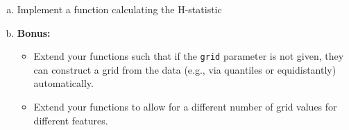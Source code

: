 {\begin{enumerate}[a)]
        \item
        Implement a function calculating the H-statistic

        \item \textbf{Bonus:}
        \begin{itemize}
            \item Extend your functions such that if the \texttt{grid} parameter is not given, they can construct a grid from the data (e.g., via quantiles or equidistantly) automatically.
            \item Extend your functions to allow for a different number of grid values for different features.
        \end{itemize}
        
            
    \end{enumerate}
    
}